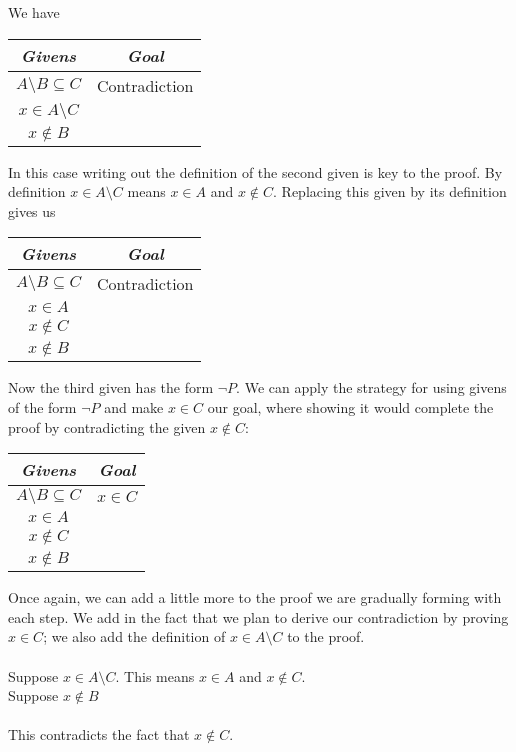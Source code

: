\documentclass{report}
\theoremstyle{definition}
\begin{document}
We have
\begin{center}
\begin{tabular}{c|c}
\textit{Givens}&\textit{Goal}\\
\hline
$A\setminus B\subseteq C$&Contradiction\\
$x\in A\setminus C$&\\
$x\notin B$&
\end{tabular}
\end{center}
In this case writing out the definition of the second given is key to the proof. By definition $x\in A\setminus C$ means $x\in A$ and $x\notin C$. Replacing this given
by its definition gives us
\begin{center}
\begin{tabular}{c|c}
\textit{Givens}&\textit{Goal}\\
\hline
$A\setminus B\subseteq C$&Contradiction\\
$x\in A$&\\
$x\notin C$&\\
$x\notin B$&
\end{tabular}
\end{center}
Now the third given has the form $\neg P$. We can apply the strategy for using givens of the form $\neg P$ and make $x\in C$ our goal, where showing it would complete the proof by contradicting
the given $x\notin C$:
\begin{center}
\begin{tabular}{c|c}
\textit{Givens}&\textit{Goal}\\
\hline
$A\setminus B\subseteq C$&$x\in C$\\
$x\in A$&\\
$x\notin C$&\\
$x\notin B$&
\end{tabular}
\end{center}
Once again, we can add a little more to the proof we are gradually forming with each step. We add in the fact that we plan to derive our contradiction by proving $x\in C$; we
also add the definition of $x\in A\setminus C$ to the proof.\\
\vspace{1mm}\\
\indent Suppose $x\in A\setminus C$. This means $x\in A$ and $x\notin C$.\\
\indent\indent Suppose $x\notin B$\\
\indent\indent\indent{}\\
\indent\indent\indent This contradicts the fact that $x\notin C$.\\
\end{document}
